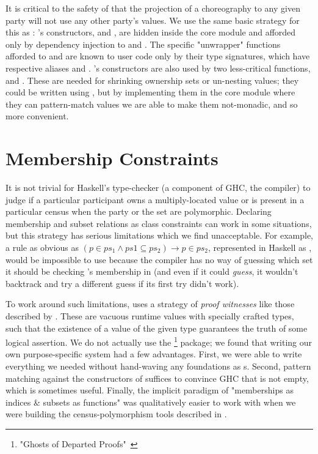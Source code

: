 It is critical to the safety of \MultiChor that the projection of a choreography to any given party will not use
any other party's  values.
We use the same basic strategy for this as \HasChor:
's constructors,  and , are hidden inside the core module
and afforded only by dependency injection to  and .
The specific "unwrapper" functions afforded to  and 
are known to user code only by their type signatures, which have respective aliases  and .
's constructors are also used by two less-critical functions,  and .
These are needed for shrinking ownership sets or un-nesting  values;
they could be written using ,
but by implementing them in the core module where they can pattern-match  values we are able to make them not-monadic,
and so more convenient.


\section{Membership Constraints}
\label{sec:membership}

It is not trivial for Haskell's type-checker (a component of GHC, the compiler) to judge if
a particular participant owns a multiply-located value or is present in a particular census
when the party or the set are polymorphic.
Declaring membership and subset relations as class constraints can work in some situations,
but this strategy has serious limitations which we find unacceptable.
For example, a rule as obvious as
$(p \in ps_1 \land ps1 \subseteq ps_2) \to p \in ps_2$,
represented in Haskell as
,
would be impossible to use because the compiler has no way of guessing which set 
it should be checking 's membership in
(and even if it could \emph{guess}, it wouldn't backtrack and try a different guess if its first try didn't work).

To work around such limitations, \MultiChor uses a strategy of \emph{proof witnesses}
like those described by \cite{noonanGDP}.
These are vacuous runtime values with specially crafted types,
such that the existence of a value of the given type guarantees the truth of some logical assertion.
We do not actually use the \footnote{
    "Ghosts of Departed Proofs"~\cite{gdp_hackage}
} package; we found that writing our own purpose-specific system had a few advantages.
First, we were able to write everything we needed without hand-waving any foundations as s.
Second, pattern matching against the constructors of  suffices to convince GHC that  is not empty,
which is sometimes useful.
Finally, the implicit paradigm of "memberships as indices \& subsets as functions" was qualitatively easier to work with
when we were building the census-polymorphism tools described in .

